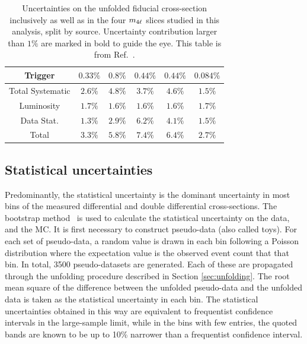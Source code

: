 \begin{table}
\begin{tabular} {c  c  c  c  c  c }
        Trigger &  $ 0.33\% $  &  $ 0.8\% $  &  $ 0.44\% $  &  $ 0.44\% $  &  $ 0.084\% $ \\
        \hline 
        Total Systematic &  $ 2.6\% $  &  $ 4.8\% $  &  $ 3.7\% $  &  $ 4.6\% $  &  $ 1.5\% $ \\
        Luminosity &  $ \mathbf{1.7}\% $  &  $ \mathbf{1.6}\% $  &  $ \mathbf{1.6}\% $  &  $ \mathbf{1.6}\% $  &  $ \mathbf{1.7}\% $ \\
        Data Stat. &  $ \mathbf{1.3}\% $  &  $ \mathbf{2.9}\% $  &  $ \mathbf{6.2}\% $  &  $ \mathbf{4.1}\% $  &  $ \mathbf{1.5}\% $ \\
        \hline 
        Total &  $ 3.3\% $  &  $ 5.8\% $  &  $ 7.4\% $  &  $ 6.4\% $  &  $ 2.7\% $ \\
        \hline 
     \end{tabular}
    \caption{Uncertainties on the unfolded fiducial cross-section inclusively as well as in the four $m_{4\ell}$ slices studied in this analysis, split by source. Uncertainty contribution larger than $1\%$ are marked in bold to guide the eye. This table is from Ref.~\cite{m4l_internalnote}. \label{tab:SysTablePerSlice} }
\end{table}

\subsection{Statistical uncertainties} \label{ssec:statuncert}

Predominantly, the statistical uncertainty is the dominant uncertainty in most bins of the measured differential and double differential cross-sections. The bootstrap method~\cite{ATLAS_Bootstrap_2021} is used to calculate the statistical uncertainty on the data, and the MC. It is first necessary to construct pseudo-data (also called toys). For each set of pseudo-data, a random value is drawn in each bin following a Poisson distribution where the expectation value is the observed event count that that bin. In total, 3500 pseudo-datasets are generated. Each of these are propagated through the unfolding procedure described in Section \ref{sec:unfolding}. The root mean square of the difference between the unfolded pseudo-data and the unfolded data is taken as the statistical uncertainty in each bin. The statistical uncertainties obtained in this way are equivalent to frequentist confidence intervals in the large-sample limit, while in the bins with few entries, the quoted bands are known to be up to 10\% narrower than a frequentist confidence interval.

